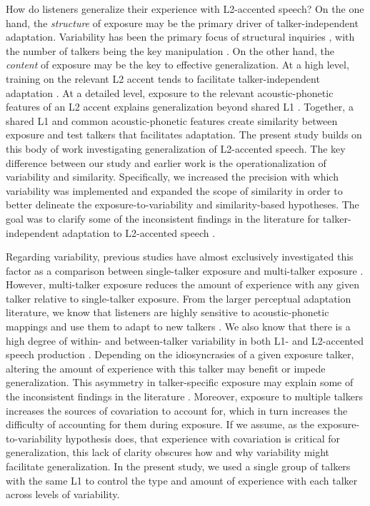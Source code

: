 \documentclass[preprint, 3p, authoryear]{elsarticle} %
\begin{document}
How do listeners generalize their experience with L2-accented speech?
On the one hand, the \emph{structure} of exposure may be the primary driver of talker-independent adaptation.
Variability has been the primary focus of structural inquiries \citep{baese2013}, with the number of talkers being the key manipulation \citep{bradlow2008, bieber2022, choi2019, xie2021}.
On the other hand, the \emph{content} of exposure may be the key to effective generalization.
At a high level, training on the relevant L2 accent tends to facilitate talker-independent adaptation \citep{bradlow2023, clarke2004, xie2018, alexander2019}.
At a detailed level, exposure to the relevant acoustic-phonetic features of an L2 accent explains generalization beyond shared L1 \citep{xie2017similarity, sidaras2009, reinisch2014}.
Together, a shared L1 and common acoustic-phonetic features create similarity between exposure and test talkers that facilitates adaptation.
The present study builds on this body of work investigating generalization of L2-accented speech.
The key difference between our study and earlier work is the operationalization of variability and similarity.
Specifically, we increased the precision with which variability was implemented \citep[c.f.][]{baese2013} and expanded the scope of similarity \citep[c.f.][]{xie2017similarity} in order to better delineate the exposure-to-variability and similarity-based hypotheses.
The goal was to clarify some of the inconsistent findings in the literature for talker-independent adaptation to L2-accented speech \citep{bent2021}.

Regarding variability, previous studies have almost exclusively investigated this factor as a comparison between single-talker exposure and multi-talker exposure \citep[c.f.][]{baese2013, bradlow2023}.
However, multi-talker exposure reduces the amount of experience with any given talker relative to single-talker exposure.
From the larger perceptual adaptation literature, we know that listeners are highly sensitive to acoustic-phonetic mappings and use them to adapt to new talkers \citep[e.g.,][]{kraljic2006}.
We also know that there is a high degree of within- and between-talker variability in both L1- and L2-accented speech production \citep{xie2020, wade2007}.
Depending on the idiosyncrasies of a given exposure talker, altering the amount of experience with this talker may benefit or impede generalization.
This asymmetry in talker-specific exposure may explain some of the inconsistent findings in the literature \citep{xie2017similarity, xie2021}.
Moreover, exposure to multiple talkers increases the sources of covariation to account for, which in turn increases the difficulty of accounting for them during exposure.
If we assume, as the exposure-to-variability hypothesis does, that experience with covariation is critical for generalization, this lack of clarity obscures how and why variability might facilitate generalization.
In the present study, we used a single group of talkers with the same L1 to control the type and amount of experience with each talker across levels of variability.
\end{document}
